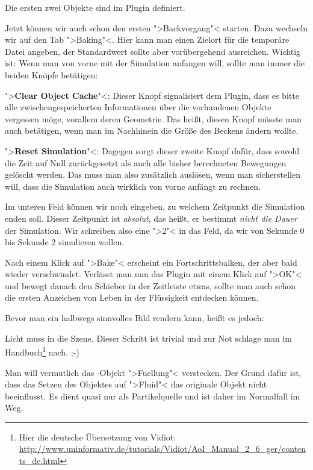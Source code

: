 \documentclass[10pt,DIV=14,a4paper]{scrartcl}
\begin{document}
{Die ersten zwei Objekte sind im Plugin definiert.}

Jetzt können wir auch schon den ersten ">Backvorgang"<
starten. Dazu wechseln wir auf den Tab ">Baking"<. Hier
kann man einen Zielort für die temporäre Datei angeben, der Standardwert
sollte aber vorübergehend ausreichen. Wichtig ist: Wenn man von vorne
mit der Simulation anfangen will, sollte man immer die beiden Knöpfe
betätigen:

\itA
	\item ">\textbf{Clear Object Cache}"<: Dieser Knopf signalisiert dem
	Plugin, dass es bitte alle zwischengespeicherten Informationen über
	die vorhandenen Objekte vergessen möge, vorallem deren Geometrie.
	Das heißt, diesen Knopf müsste man auch betätigen, wenn man im
	Nachhinein die Größe des Beckens ändern wollte.

	\item ">\textbf{Reset Simulation}"<: Dagegen sorgt dieser zweite
	Knopf dafür, dass sowohl die Zeit auf Null zurückgesetzt als auch
	alle bisher berechneten Bewegungen gelöscht werden. Das muss man
	also zusätzlich auslösen, wenn man sicherstellen will, dass die
	Simulation auch wirklich von vorne anfängt zu rechnen.

\itE

Im unteren Feld können wir noch eingeben, zu welchem Zeitpunkt die
Simulation enden soll. Dieser Zeitpunkt ist \emph{absolut}, das heißt,
er bestimmt \emph{nicht die Dauer} der Simulation. Wir schreiben also
eine ">2"< in das Feld, da wir von Sekunde 0 bis Sekunde 2 simulieren
wollen.

Nach einem Klick auf ">Bake"< erscheint ein Fortschrittsbalken, der aber
bald wieder verschwindet. Verlässt man nun das Plugin mit einem Klick
auf ">OK"< und bewegt danach den Schieber in der Zeitleiste etwas,
sollte man auch schon die ersten Anzeichen von Leben in der Flüssigkeit
entdecken können.

Bevor man ein halbwegs sinnvolles Bild rendern kann, heißt es jedoch:

\itA
	\item Licht muss in die Szene. Dieser Schritt ist trivial und zur
	Not schlage man im Handbuch\footnote{Hier die deutsche Übersetzung
	von Vidiot: \\
	\url{http://www.uninformativ.de/tutorials/Vidiot/AoI_Manual_2_6_ger/contents_de.html}}
	nach. ;-)

	\item Man will vermutlich das \PolyMesh-Objekt ">Fuellung"<
	verstecken. Der Grund dafür ist, dass das Setzen des Objektes auf
	">Fluid"< das originale Objekt nicht beeinflusst. Es dient quasi nur
	als Partikelquelle und ist daher im Normalfall im Weg.
\end{document}

